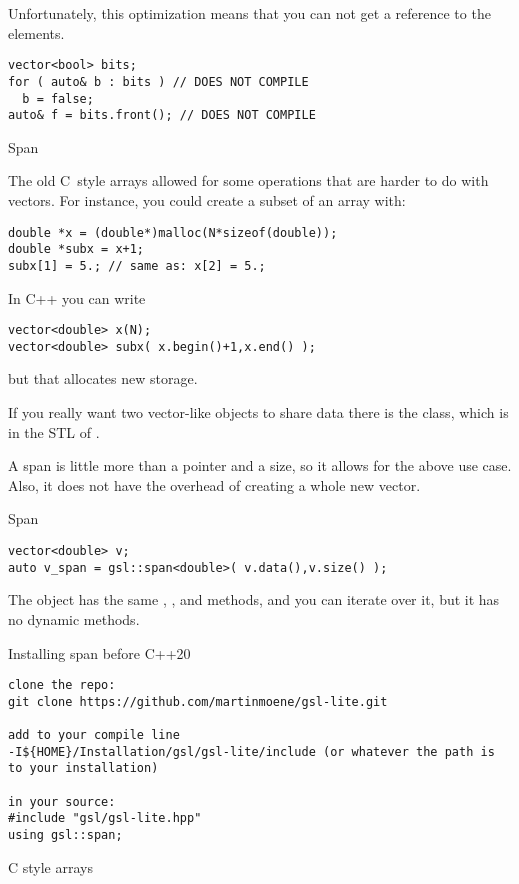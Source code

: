 Unfortunately, this optimization means that you can not
get a reference to the elements.
\begin{lstlisting}
vector<bool> bits;
for ( auto& b : bits ) // DOES NOT COMPILE
  b = false;
auto& f = bits.front(); // DOES NOT COMPILE
\end{lstlisting}

 {Span}
\label{sec:gsl-span}

The old C~style arrays allowed for some operations that are harder to
do with vectors. For instance, you could create a subset of an array with:
\begin{lstlisting}
double *x = (double*)malloc(N*sizeof(double));
double *subx = x+1;
subx[1] = 5.; // same as: x[2] = 5.;
\end{lstlisting}
In C++ you can write
\begin{lstlisting}
vector<double> x(N);
vector<double> subx( x.begin()+1,x.end() );
\end{lstlisting}
but that allocates new storage.

If you really want two vector-like objects to share data there is the
 class, which is in the \ac{STL} of .

A span is little more than a pointer and a size, so it allows for the
above use case. Also, it does not have the overhead of creating a
whole new vector.

\begin{block}{Span}
  \label{sl:spandef}
\begin{lstlisting}
vector<double> v;
auto v_span = gsl::span<double>( v.data(),v.size() );
\end{lstlisting}
The  object has the same , , and
 methods, and you can iterate over it, but it has no
dynamic methods.
\end{block}

 {Installing span before C++20}

\begin{verbatim}
clone the repo: 
git clone https://github.com/martinmoene/gsl-lite.git

add to your compile line 
-I${HOME}/Installation/gsl/gsl-lite/include (or whatever the path is to your installation)

in your source:
#include "gsl/gsl-lite.hpp"
using gsl::span;
\end{verbatim}

 {C style arrays}
\label{sec:staticarray}

